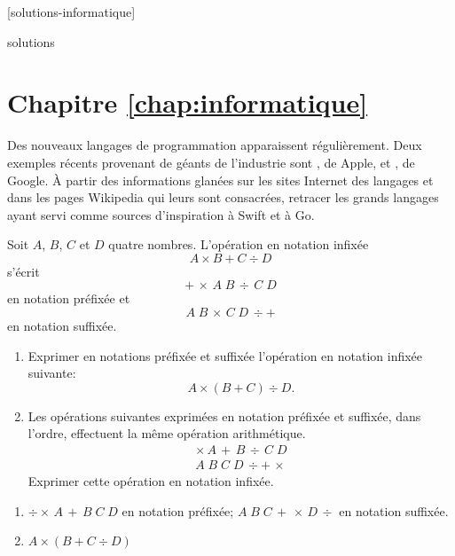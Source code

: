 [solutions-informatique]

\begin{Filesave}{solutions}
\section*{Chapitre \ref*{chap:informatique}}

\end{Filesave}

\begin{exercice}[nosol]
  Des nouveaux langages de programmation apparaissent régulièrement.
  Deux exemples récents provenant de géants de l'industrie sont
  , de Apple, et
  , de Google. À partir des informations
  glanées sur les sites Internet des langages et dans les pages
  Wikipedia qui leurs sont consacrées, retracer les grands langages
  ayant servi comme sources d'inspiration à Swift et à
  Go.
\end{exercice}

\begin{exercice}
  Soit $A$, $B$, $C$ et $D$ quatre nombres. L'opération en notation
  infixée
  \begin{equation*}
    A \times B + C \div D
  \end{equation*}
  s'écrit
  \begin{equation*}
    +\, \times\, A\; B\, \div\, C\; D
  \end{equation*}
  en notation préfixée et
  \begin{equation*}
    A\; B\, \times\, C\; D\, \div +
  \end{equation*}
  en notation suffixée.
  \begin{enumerate}
  \item Exprimer en notations préfixée et suffixée l'opération en
    notation infixée suivante:
    \begin{equation*}
      A \times (B + C) \div D.
    \end{equation*}
  \item Les opérations suivantes exprimées en notation préfixée et
    suffixée, dans l'ordre, effectuent la même opération arithmétique.
    \begin{gather*}
      \times\, A\, +\, B\, \div\, C\; D \\
      A\; B\; C\; D\, \div +\, \times
    \end{gather*}
    Exprimer cette opération en notation infixée.
  \end{enumerate}
  \begin{sol}
    \begin{enumerate}
    \item $\div \times\, A\, +\, B\; C\; D$ en notation préfixée;
      $A\; B\; C\, +\, \times\, D\, \div$ en notation suffixée.
    \item $A \times (B + C \div D)$
    \end{enumerate}
  \end{sol}
\end{exercice}

